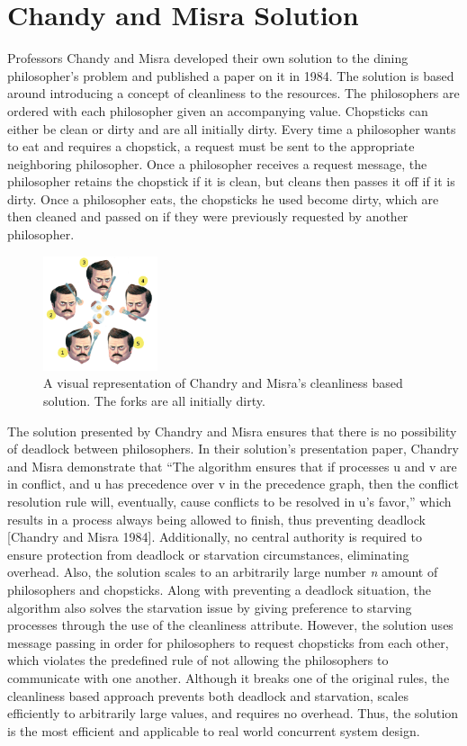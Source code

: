 \documentclass{article}
\begin{document}
\section{Chandy and Misra Solution} Professors Chandy and Misra developed their own solution to the dining philosopher's problem and published a paper on it in 1984. The solution is based around introducing a concept of cleanliness to the resources. The philosophers are ordered with each philosopher given an accompanying value. Chopsticks can either be clean or dirty and are all initially dirty. Every time a philosopher wants to eat and requires a chopstick, a request must be sent to the appropriate neighboring philosopher. Once a philosopher receives a request message, the philosopher retains the chopstick if it is clean, but cleans then passes it off if it is dirty. Once a philosopher eats, the chopsticks he used become dirty, which are then cleaned and passed on if they were previously requested by another philosopher.

\begin{figure}[H]
\begin{center}
\includegraphics[width=0.3\textwidth]{clean.png}
\caption{A visual representation of Chandry and Misra's cleanliness based solution. The forks are all initially dirty.}
\end{center}
\end{figure}

The solution presented by Chandry and Misra ensures that there is no possibility of deadlock between philosophers. In their solution's presentation paper, Chandry and Misra demonstrate that ``The algorithm ensures that if processes u and v are in conflict, and u has precedence over v in the precedence graph, then the conflict resolution rule will, eventually, cause conflicts to be resolved in u's favor,'' which results in a process always being allowed to finish, thus preventing deadlock [Chandry and Misra 1984]. Additionally, no central authority is required to ensure protection from deadlock or starvation circumstances, eliminating overhead. Also, the solution scales to an arbitrarily large number \emph{n} amount of philosophers and chopsticks. Along with preventing a deadlock situation, the algorithm also solves the starvation issue by giving preference to starving processes through the use of the cleanliness attribute. However, the solution uses message passing in order for philosophers to request chopsticks from each other, which violates the predefined rule of not allowing the philosophers to communicate with one another. Although it breaks one of the original rules, the cleanliness based approach prevents both deadlock and starvation, scales efficiently to arbitrarily large values, and requires no overhead. Thus, the solution is the most efficient and applicable to real world concurrent system design.
\end{document}
